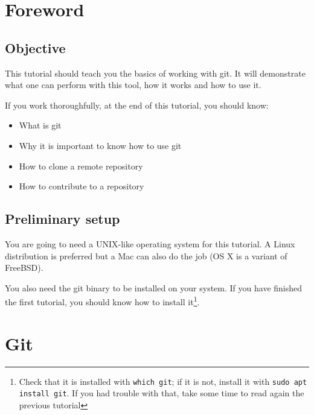 \documentclass[12pt]{article}
\begin{document}

\tableofcontents
\pagebreak


\section{Foreword}

\subsection{Objective}
This tutorial should teach you the basics of working with git.
It will demonstrate what one can perform with this tool, how it works and how to use it.

If you work thoroughfully, at the end of this tutorial, you should know:

\begin{itemize}
\item What is git
\item Why it is important to know how to use git
\item How to clone a remote repository
\item How to contribute to a repository
\end{itemize}


\subsection{Preliminary setup}

You are going to need a UNIX-like operating system for this tutorial.
A Linux distribution is preferred but a Mac can also do the job (OS X is a variant of FreeBSD).

You also need the git binary to be installed on your system. If you have finished the first tutorial, you should know how to install it\footnote{Check that it is installed with \texttt{which git}; if it is not, install it with \texttt{sudo apt install git}. If you had trouble with that, take some time to read again the previous tutorial}.


\section{Git}
\end{document}
